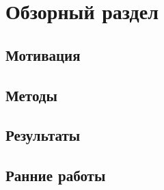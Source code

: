 \section{Обзорный раздел}

\subsection{Мотивация}

\subsection{Методы}

\subsection{Результаты}

\subsection{Ранние работы}

